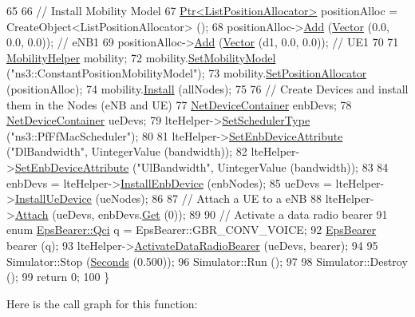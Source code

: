 \begin{DoxyCode}
65 
66   \textcolor{comment}{// Install Mobility Model}
67   \hyperlink{classns3_1_1Ptr}{Ptr<ListPositionAllocator>} positionAlloc = CreateObject<ListPositionAllocator> 
      ();
68   positionAlloc->\hyperlink{classns3_1_1ListPositionAllocator_a460e82f015ac012a73ba0ea0cccb3486}{Add} (\hyperlink{classns3_1_1Vector3D_a7e59b47bc94c9cb1dadff68c1d0112d8}{Vector} (0.0, 0.0, 0.0));                 \textcolor{comment}{// eNB1}
69   positionAlloc->\hyperlink{classns3_1_1ListPositionAllocator_a460e82f015ac012a73ba0ea0cccb3486}{Add} (\hyperlink{classns3_1_1Vector3D_a7e59b47bc94c9cb1dadff68c1d0112d8}{Vector} (d1, 0.0, 0.0));                  \textcolor{comment}{// UE1}
70 
71   \hyperlink{classns3_1_1MobilityHelper}{MobilityHelper} mobility;
72   mobility.\hyperlink{classns3_1_1MobilityHelper_a030275011b6f40682e70534d30280aba}{SetMobilityModel} (\textcolor{stringliteral}{"ns3::ConstantPositionMobilityModel"});
73   mobility.\hyperlink{classns3_1_1MobilityHelper_ac59d5295076be3cc11021566713a28c5}{SetPositionAllocator} (positionAlloc);
74   mobility.\hyperlink{classns3_1_1MobilityHelper_a07737960ee95c0777109cf2994dd97ae}{Install} (allNodes);
75 
76   \textcolor{comment}{// Create Devices and install them in the Nodes (eNB and UE)}
77   \hyperlink{classns3_1_1NetDeviceContainer}{NetDeviceContainer} enbDevs;
78   \hyperlink{classns3_1_1NetDeviceContainer}{NetDeviceContainer} ueDevs;
79   lteHelper->\hyperlink{classns3_1_1LteHelper_a8f86e55b8b80a81732c4b2df00fb25d5}{SetSchedulerType} (\textcolor{stringliteral}{"ns3::PfFfMacScheduler"});
80 
81   lteHelper->\hyperlink{classns3_1_1LteHelper_ac42f0f3d6cd8473d810bfbbeb5d592e0}{SetEnbDeviceAttribute} (\textcolor{stringliteral}{"DlBandwidth"}, UintegerValue (bandwidth));
82   lteHelper->\hyperlink{classns3_1_1LteHelper_ac42f0f3d6cd8473d810bfbbeb5d592e0}{SetEnbDeviceAttribute} (\textcolor{stringliteral}{"UlBandwidth"}, UintegerValue (bandwidth));
83 
84   enbDevs = lteHelper->\hyperlink{classns3_1_1LteHelper_a5e009ad35ef85f46b5a6099263f15a03}{InstallEnbDevice} (enbNodes);
85   ueDevs = lteHelper->\hyperlink{classns3_1_1LteHelper_ac9cd932d7de92811cfa953c2e3b2fc9f}{InstallUeDevice} (ueNodes);
86 
87   \textcolor{comment}{// Attach a UE to a eNB}
88   lteHelper->\hyperlink{classns3_1_1LteHelper_a9466743f826aa2652a87907b7f0a1c87}{Attach} (ueDevs, enbDevs.\hyperlink{classns3_1_1NetDeviceContainer_a677d62594b5c9d2dea155cc5045f4d0b}{Get} (0));
89 
90   \textcolor{comment}{// Activate a data radio bearer}
91   \textcolor{keyword}{enum} \hyperlink{structns3_1_1EpsBearer_aecf0c67109c5eb4ec0b07226fff5885e}{EpsBearer::Qci} q = EpsBearer::GBR\_CONV\_VOICE;
92   \hyperlink{structns3_1_1EpsBearer}{EpsBearer} bearer (q);
93   lteHelper->\hyperlink{classns3_1_1LteHelper_ac896e16cf162e4beeaa292d39ab1b700}{ActivateDataRadioBearer} (ueDevs, bearer);
94 
95   Simulator::Stop (\hyperlink{group__timecivil_ga33c34b816f8ff6628e33d5c8e9713b9e}{Seconds} (0.500));
96   Simulator::Run ();
97 
98   Simulator::Destroy ();
99   \textcolor{keywordflow}{return} 0;
100 \}
\end{DoxyCode}


Here is the call graph for this function\+:



